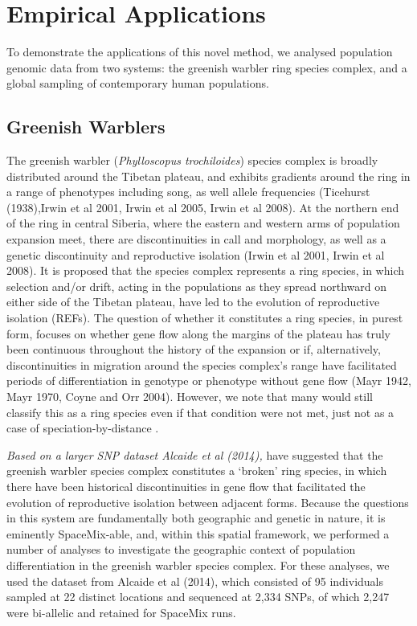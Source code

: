 \documentclass[12pt]{article}
\newcommand{\gc}[1]{{\em \color{blue} #1}}
\begin{document}
\section*{Empirical Applications}
To demonstrate the applications of this novel method, we analysed population genomic data from two systems: the greenish warbler ring species complex, and a global sampling of contemporary human populations.

\subsection*{Greenish Warblers}  
The greenish warbler (\emph{Phylloscopus trochiloides}) species complex is broadly distributed around the Tibetan plateau, and exhibits gradients around the ring in a range of phenotypes including song, as well allele frequencies (Ticehurst (1938),Irwin et al 2001, Irwin et al 2005, Irwin et al 2008).  At the northern end of the ring in central Siberia, where the eastern and western arms of population expansion meet, there are discontinuities in call and morphology, as well as a genetic discontinuity and reproductive isolation (Irwin et al 2001, Irwin et al 2008). It is proposed that the species complex represents a ring species, in which selection and/or drift, acting in the populations as they spread northward on either side of the Tibetan plateau, have led to the evolution of reproductive isolation (REFs).  The question of whether it constitutes a ring species, in purest form, focuses on whether gene flow along the margins of the plateau has truly been continuous throughout the history of the expansion or if, alternatively, discontinuities in migration around the species complex's range have facilitated periods of differentiation in genotype or phenotype without gene flow (Mayr 1942, Mayr 1970, Coyne and Orr 2004).  However, we note that many would still classify this as a ring species even if that condition were not met, just not as a case of speciation-by-distance \citep[see][ for discussion]{}.


\gc{Based on a larger SNP dataset Alcaide et al (2014),} have suggested that the greenish warbler species complex constitutes a `broken' ring species, in which there have been historical discontinuities in gene flow that facilitated the evolution of reproductive isolation between adjacent forms.  Because the questions in this system are fundamentally both geographic and genetic in nature, it is eminently SpaceMix-able, and, within this spatial framework, we performed a number of analyses to investigate the geographic context of population differentiation in the greenish warbler species complex. For these analyses, we used the dataset from Alcaide et al (2014), which consisted of 95 individuals sampled at 22 distinct locations and sequenced at 2,334 SNPs, of which 2,247 were bi-allelic and retained for SpaceMix runs. 
\end{document}
